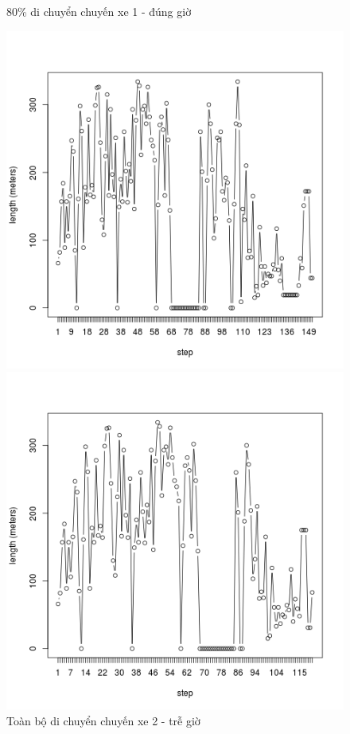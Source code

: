 \documentclass[a4paper, 13pt]{report}
\begin{document}
\begin{figure}[!htb]
  \caption*{80\% di chuyển chuyến xe 1 - đúng giờ}
\endminipage
{}%
  \includegraphics[width=\linewidth]{test_100_2}
  \caption*{Toàn bộ di chuyển chuyến xe 2 - trễ giờ}
\endminipage
{}
  \includegraphics[width=\linewidth]{test_80_2}

\end{figure}
\end{document}
